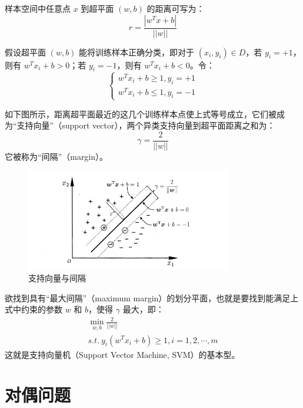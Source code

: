 \documentclass[12pt, a4paper]{article} %
\begin{document}
样本空间中任意点 $x$ 到超平面 $(w, b)$ 的距离可写为：
\begin{equation*}
    r = \frac{|w^T x + b|}{||w||}
\end{equation*}

假设超平面 $(w, b)$ 能将训练样本正确分类，即对于 $(x_i, y_i) \in D$，若 $y_i = +1$，则有 $w^T x_i + b > 0$；若 $y_i = -1$，则有 $w^T x_i + b < 0$。令：
\begin{equation*}
    \left\{\begin{matrix}
        w^T x_i + b \ge 1, y_i = +1 \\
        w^T x_i + b \le 1, y_i = -1
    \end{matrix}\right.
\end{equation*}

如下图所示，距离超平面最近的这几个训练样本点使上式等号成立，它们被成为“支持向量”（support vector），两个异类支持向量到超平面距离之和为：
\begin{equation*}
    \gamma = \frac{2}{||w||}
\end{equation*}
它被称为“间隔”（margin）。

\begin{figure}[H]
    \centering
    \includegraphics[width=0.8\textwidth]{../img/6-2-支持向量与间隔.png}
    \caption{支持向量与间隔}
    \label{fig:支持向量与间隔}
\end{figure}

欲找到具有“最大间隔”（maximum margin）的划分平面，也就是要找到能满足上式中约束的参数 $w$ 和 $b$，使得 $\gamma$ 最大，即：
\begin{equation*}
    \begin{array}{*{20}{l}}
        \displaystyle \min_{w, b} \frac{2}{||w||} \\
        \displaystyle s.t. \ y_i(w^T x_i + b) \ge 1, i = 1, 2, \cdots, m
    \end{array}
\end{equation*}
这就是支持向量机（Support Vector Machine, SVM）的基本型。

\section{对偶问题}
\end{document}
